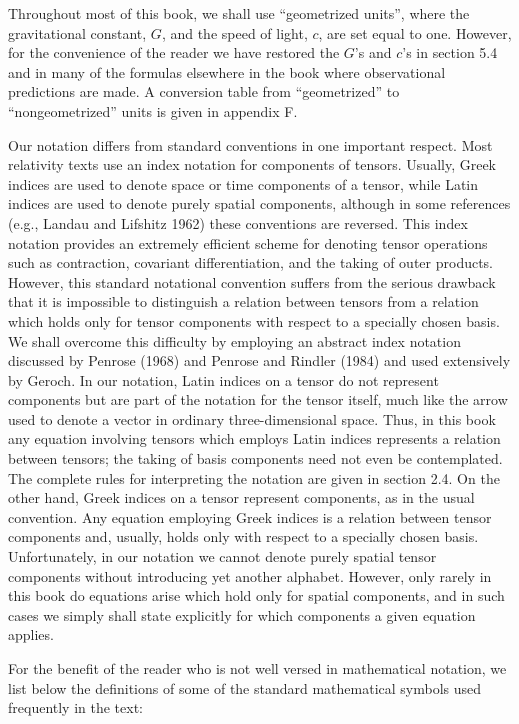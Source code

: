 Throughout most of this book, we shall use \textquotedblleft geometrized
units\textquotedblright, where the gravitational constant, \(G\), and the speed
of light, \(c\), are set equal to one. However, for the convenience of the reader
we have restored the \(G\)'s and \(c\)'s in section 5.4 and in many of the
formulas elsewhere in the book where observational predictions are made. A
conversion table from \textquotedblleft geometrized\textquotedblright{} to
\textquotedblleft nongeometrized\textquotedblright{} units is given in appendix F.

Our notation differs from standard conventions in one important respect. Most
relativity texts use an index notation for components of tensors. Usually, Greek
indices are used to denote space or time components of a tensor, while Latin
indices are used to denote purely spatial components, although in some references
(e.g., Landau and Lifshitz 1962) these conventions are reversed. This index
notation provides an extremely efficient scheme for denoting tensor operations such
as contraction, covariant differentiation, and the taking of outer products.
However, this standard notational convention suffers from the serious drawback
that it is impossible to distinguish a relation between tensors from a relation
which holds only for tensor components with respect to a specially chosen basis.
We shall overcome this difficulty by employing an abstract index notation
discussed by Penrose (1968) and Penrose and Rindler (1984) and used extensively
by Geroch. In our notation, Latin indices on a tensor do not represent components
but are part of the notation for the tensor itself, much like the arrow used to
denote a vector in ordinary three-dimensional space. Thus, in this book any
equation involving tensors which employs Latin indices represents a relation
between tensors; the taking of basis components need not even be contemplated.
The complete rules for interpreting the notation are given in section 2.4. On the
other hand, Greek indices on a tensor represent components, as in the usual
convention. Any equation employing Greek indices is a relation between tensor
components and, usually, holds only with respect to a specially chosen basis.
Unfortunately, in our notation we cannot denote purely spatial tensor components
without introducing yet another alphabet. However, only rarely in this book do
equations arise which hold only for spatial components, and in such cases we simply
shall state explicitly for which components a given equation applies.

For the benefit of the reader who is not well versed in mathematical notation, we
list below the definitions of some of the standard mathematical symbols used
frequently in the text:

